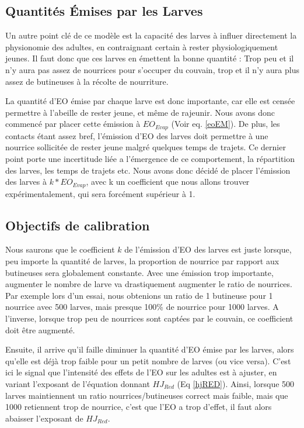 	
	
	\subsection{Quantités Émises par les Larves}
	Un autre point clé de ce modèle est la capacité des larves à influer directement la physionomie des adultes, en contraignant certain à rester physiologiquement jeunes. Il faut donc  que ces larves en émettent la bonne quantité : Trop peu et il n'y aura pas assez de nourrices pour s'occuper du couvain, trop et il n'y aura plus assez de butineuses à la récolte de nourriture.
	
	La quantité d'EO émise par chaque larve est donc importante, car elle est censée permettre à l'abeille de rester jeune, et même de rajeunir. Nous avons donc commencé par placer cette émission à $EO_{Evap}$ (Voir eq. \ref{eoEM}). De plus, les contacts étant assez bref, l'émission d'EO des larves doit permettre à une nourrice sollicitée de rester jeune malgré quelques temps de trajets. Ce dernier point porte une incertitude liée a l'émergence de ce comportement, la répartition des larves, les temps de trajets etc. Nous avons donc décidé de placer l'émission des larves à $k * EO_{Evap}$, avec k un coefficient que nous allons trouver expérimentalement, qui sera forcément supérieur à 1.
	
	\subsection{Objectifs de calibration}
	Nous saurons que le coefficient $k$ de l'émission d'EO des larves est juste lorsque, peu importe la quantité de larves, la proportion de nourrice par rapport aux butineuses sera globalement constante. Avec une émission trop importante, augmenter le nombre de larve va drastiquement augmenter le ratio de nourrices. Par exemple lors d'un essai, nous obtenions un ratio de 1 butineuse pour 1 nourrice avec 500 larves, mais presque 100\% de nourrice pour 1000 larves. A l'inverse, lorsque trop peu de nourrices sont captées par le couvain, ce coefficient doit être augmenté.
	
	Ensuite, il arrive qu'il faille diminuer la quantité d'EO émise par les larves, alors qu'elle est déjà trop faible pour un petit nombre de larves (ou vice versa). C'est ici le signal que l'intensité des effets de l'EO sur les adultes est à ajuster, en variant l'exposant de l'équation donnant $HJ_{Red}$ (Eq \ref{hjRED}). Ainsi, lorsque 500 larves maintiennent un ratio nourrices/butineuses correct mais faible, mais que 1000 retiennent trop de nourrice, c'est que l'EO a trop d'effet, il faut alors abaisser l'exposant de $HJ_{Red}$. 
	
